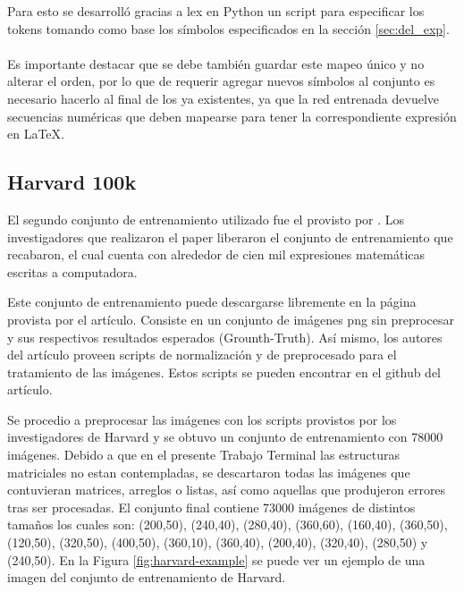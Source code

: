Para esto se desarrolló gracias a lex en Python un script para especificar los tokens tomando como base los símbolos especificados en la sección \ref{sec:del_exp}.\\\\






\vspace{1em}
Es importante destacar que se debe también guardar este mapeo único y no alterar el orden, por lo que de requerir agregar nuevos símbolos al conjunto es necesario hacerlo al final de los ya existentes, ya que la red entrenada devuelve secuencias numéricas que deben mapearse para tener la correspondiente expresión en \LaTeX{}.

\subsection{Harvard 100k}

El segundo conjunto de entrenamiento utilizado fue el provisto por \cite{harvard}. Los investigadores que realizaron el paper liberaron el conjunto de entrenamiento que recabaron, el cual cuenta con alrededor de cien mil expresiones matemáticas escritas a computadora.

Este conjunto de entrenamiento puede descargarse libremente en la página provista por el artículo. Consiste en un conjunto de imágenes png sin preprocesar y sus respectivos resultados esperados (Grounth-Truth). Así mismo, los autores del artículo proveen scripts de normalización y de preprocesado para el tratamiento de las imágenes. Estos scripts se pueden encontrar en el github del artículo.

Se procedio a preprocesar las imágenes con los scripts provistos por los investigadores de Harvard y se obtuvo un conjunto de entrenamiento con 78000 imágenes. Debido a que en el presente Trabajo Terminal las estructuras matriciales no estan contempladas, se descartaron todas las imágenes que contuvieran matrices, arreglos o listas, así como aquellas que produjeron errores tras ser procesadas. El conjunto final contiene 73000 imágenes de distintos tamaños los cuales son: (200,50), (240,40), (280,40), (360,60), (160,40), (360,50), (120,50), (320,50), (400,50), (360,10), (360,40), (200,40), (320,40), (280,50) y (240,50). En la Figura \ref{fig:harvard-example} se puede ver un ejemplo de una imagen del conjunto de entrenamiento de Harvard.

